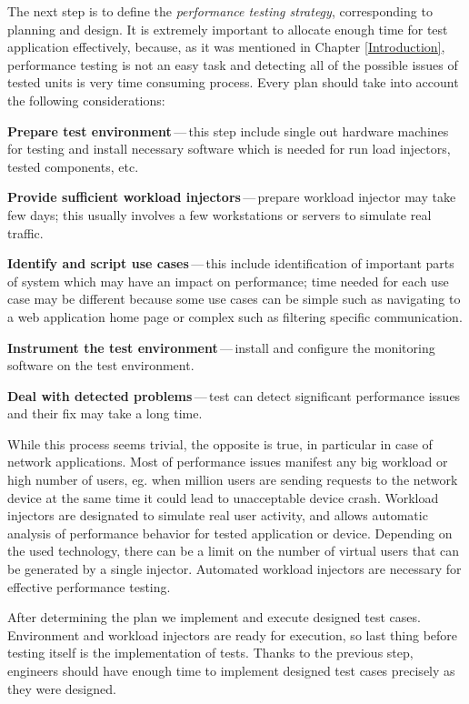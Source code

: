 The next step is to define the \emph{performance testing strategy}, corresponding to planning and design. It is extremely important to allocate enough time for test application effectively, because, as it was mentioned in Chapter \ref{Introduction}, performance testing is not an easy task and detecting all of the possible issues of tested units is very time consuming process. Every plan should take into account the following considerations:

\begin{description}
	\setlength\itemsep{0em}
	\item \textbf{Prepare test environment}\,---\,this step include single out hardware machines for testing and install necessary software which is needed for run load injectors, tested components, etc.
	\item \textbf{Provide sufficient workload injectors}\,---\,prepare workload injector may take few days; this usually involves a few workstations or servers to simulate real traffic.
	\item \textbf{Identify and script use cases}\,---\,this include identification of important parts of system which may have an impact on performance; time needed for each use case may be different because some use cases can be simple such as navigating to a web application home page or complex such as filtering specific communication.
	\item \textbf{Instrument the test environment}\,---\,install and configure the monitoring software on the test environment.
	\item \textbf{Deal with detected problems}\,---\,test can detect significant performance issues and their fix may take a long time.
\end{description}

While this process seems trivial, the opposite is true, in particular in case of network applications. Most of performance issues manifest any big workload or high number of users, eg. when million users are sending requests to the network device at the same time it could lead to unacceptable device crash. Workload injectors are designated to simulate real user activity, and allows automatic analysis of performance behavior for tested application or device. Depending on the used technology, there can be a limit on the number of virtual users that can be generated by a single injector. Automated workload injectors are necessary for effective performance testing.

After determining the plan we implement and execute designed test cases. Environment and workload injectors are ready for execution, so last thing before testing itself is the implementation of tests. Thanks to the previous step, engineers should have enough time to implement designed test cases precisely as they were designed. 

